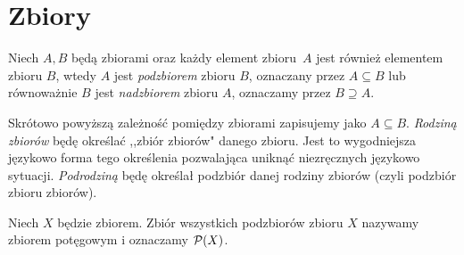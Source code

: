 \section{Zbiory}{
    \label{chp:sets}
    \begin{definition}
        Niech $A, B$ będą zbiorami oraz każdy element zbioru~$A$ jest również elementem zbioru $B$, wtedy $A$ jest \emph{podzbiorem} zbioru $B$, oznaczany przez $A\subseteq B$ lub równoważnie $B$ jest \emph{nadzbiorem} zbioru $A$, oznaczamy przez $B\supseteq A.$
    \end{definition}
    Skrótowo powyższą zależność pomiędzy zbiorami zapisujemy jako $A\subseteq B$.
    \emph{Rodziną zbiorów} będę określać ,,zbiór zbiorów" danego zbioru. Jest to wygodniejsza językowo forma tego określenia pozwalająca uniknąć niezręcznych językowo sytuacji. \emph{Podrodziną} będę określał podzbiór danej rodziny zbiorów (czyli podzbiór zbioru zbiorów).
    \begin{definition}
        \label{def:powerset}
        Niech $X$ będzie zbiorem. Zbiór wszystkich podzbiorów zbioru $X$ nazywamy zbiorem potęgowym i oznaczamy $\mathcal{P}(X)$.
    \end{definition}
    
}